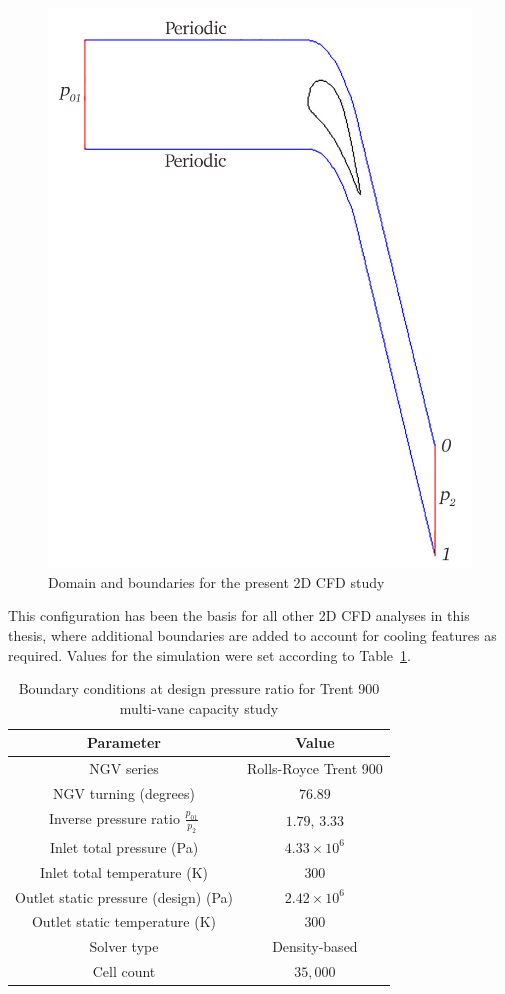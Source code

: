 \documentclass[a4paper, 11pt, oneside]{report}
\begin{document}
\begin{figure}[H]
	\centering
	\includegraphics[width=.6\textwidth]{figs/domain_boundary_conditions.png}
	\caption{Domain and boundaries for the present 2D CFD study}
	\label{fig:computational_domain_and_boundaries}
\end{figure}

This configuration has been the basis for all other 2D CFD analyses in this thesis, where additional boundaries are added to account for cooling features as required. Values for the simulation were set according to Table~\ref{T900_parameters}.

\begin{table}[H]
\caption{Boundary conditions at design pressure ratio for Trent 900 multi-vane capacity study}
\label{T900_parameters}
\begin{center}
\begin{tabular}{|c|c|}
\hline
Parameter & Value\\
\hline
NGV series & Rolls-Royce Trent 900\\
NGV turning (degrees) & $76.89$\\
Inverse pressure ratio $\frac{p_{01}}{p_2}$ & $1.79$, $3.33$\\
Inlet total pressure (Pa) & $4.33 \times 10^6$\\
Inlet total temperature (K) & $300$\\
Outlet static pressure (design) (Pa) & $2.42 \times 10^6$\\
Outlet static temperature (K) & $300$\\
Solver type & Density-based\\
Cell count & $35,000$\\
\hline
\end{tabular}
\end{center}
\end{table}
\end{document}
